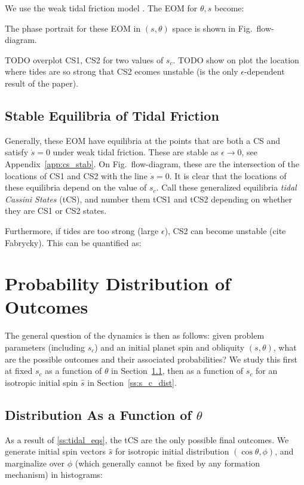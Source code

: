 \documentclass[
        fleqn,
        usenatbib,
        referee,
    ]{mnras}
\newcommand*{\p}[1]{\left(#1\right)}
\begin{document}
We use the weak tidal friction model \citep{lai2012}. The EOM for $\theta, s$
become:

The phase portrait for these EOM in $\p{s, \theta}$ space is shown in
Fig.~flow-diagram.


TODO overplot CS1, CS2 for two values of $s_c$. TODO show on plot the location
where tides are so strong that CS2 ecomes unstable (is the only
$\epsilon$-dependent result of the paper).

\subsection{Stable Equilibria of Tidal Friction}\label{ss:tidal_eqs}

Generally, these EOM have equilibria at the points that are both a CS and
satisfy $\dot{s} = 0$ under weak tidal friction. These are stable as $\epsilon
\to 0$, see Appendix~\ref{app:cs_stab}. On Fig.~flow-diagram, these are the
intersection of the locations of CS1 and CS2 with the line $\dot{s} = 0$. It is
clear that the locations of these equilibria depend on the value of $s_c$. Call
these generalized equilibria \emph{tidal Cassini States} (tCS), and number them
tCS1 and tCS2 depending on whether they are CS1 or CS2 states.

Furthermore, if tides are too strong (large $\epsilon$), CS2 can become
unstable (cite Fabrycky). This can be quantified as:

\section{Probability Distribution of Outcomes}\label{s:sim}

The general question of the dynamics is then as follows: given problem
parameters (including $s_c$) and an initial planet spin and obliquity $(s,
\theta)$, what are the possible outcomes and their associated probabilities? We
study this first at fixed $s_c$ as a function of $\theta$ in
Section~\ref{ss:q_dist}, then as a function of $s_c$ for an isotropic initial
spin $\hat{s}$ in Section~\ref{ss:s_c_dist}.

\subsection{Distribution As a Function of $\theta$}\label{ss:q_dist}

As a result of \autoref{ss:tidal_eqs}, the tCS are the only possible final
outcomes. We generate initial spin vectors $\hat{s}$ for isotropic initial
distribution $\p{\cos \theta, \phi}$, and marginalize over $\phi$ (which
generally cannot be fixed by any formation mechanism) in histograms:
\end{document}
